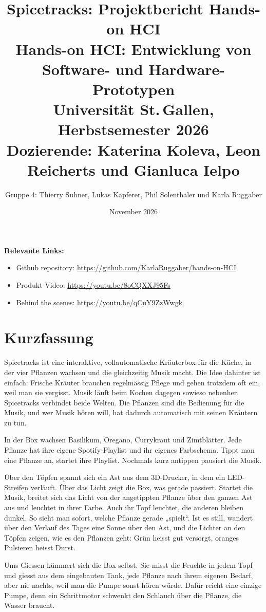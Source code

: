 \documentclass[11pt,a4paper]{article}
\title{\textbf{Spicetracks: Projektbericht Hands-on HCI}\\[0.5em]
  \large Hands-on HCI: Entwicklung von Software- und Hardware-Prototypen\\
  Universität St.\,Gallen, Herbstsemester 2026\\
  Dozierende: Katerina Koleva, Leon Reicherts und Gianluca Ielpo}
\author{Gruppe 4: Thierry Suhner, Lukas Kapferer, Phil Solenthaler und Karla Ruggaber}
\date{November 2026}
\begin{document}
\maketitle

\textbf{Relevante Links:}
\begin{itemize}
  \item Github repository: \url{https://github.com/KarlaRuggaber/hands-on-HCI}
  \item Produkt-Video: \url{https://youtu.be/8oCQXXJ95Fs}
  \item Behind the scenes: \url{https://youtu.be/qCuY9ZzWwgk}

\end{itemize}

\tableofcontents
\newpage

\section{Kurzfassung}

Spicetracks ist eine interaktive, vollautomatische Kräuterbox für die Küche, in der vier Pflanzen wachsen und die gleichzeitig Musik macht. Die Idee dahinter ist einfach: Frische Kräuter brauchen regelmässig Pflege und gehen trotzdem oft ein, weil man sie vergisst. Musik läuft beim Kochen dagegen sowieso nebenher. Spicetracks verbindet beide Welten. Die Pflanzen sind die Bedienung für die Musik, und wer Musik hören will, hat dadurch automatisch mit seinen Kräutern zu tun. 

In der Box wachsen Basilikum, Oregano, Currykraut und Zimtblätter. Jede Pflanze hat ihre eigene Spotify-Playlist und ihr eigenes Farbschema. Tippt man eine Pflanze an, startet ihre Playlist. Nochmals kurz antippen pausiert die Musik.

Über den Töpfen spannt sich ein Ast aus dem 3D-Drucker, in dem ein LED-Streifen verläuft. Über das Licht zeigt die Box, was gerade passiert. Startet die Musik, breitet sich das Licht von der angetippten Pflanze über den ganzen Ast aus und leuchtet in ihrer Farbe. Auch ihr Topf leuchtet, die anderen bleiben dunkel. So sieht man sofort, welche Pflanze gerade „spielt“. Ist es still, wandert über den Verlauf des Tages eine Sonne über den Ast, und die Lichter an den Töpfen zeigen, wie es den Pflanzen geht: Grün heisst gut versorgt, oranges Pulsieren heisst Durst.

Ums Giessen kümmert sich die Box selbst. Sie misst die Feuchte in jedem Topf und giesst aus dem eingebauten Tank, jede Pflanze nach ihrem eigenen Bedarf, aber nie nachts, weil man die Pumpe sonst hören würde. Dafür reicht eine einzige Pumpe, denn ein Schrittmotor schwenkt den Schlauch über die Pflanze, die Wasser braucht.
\end{document}
